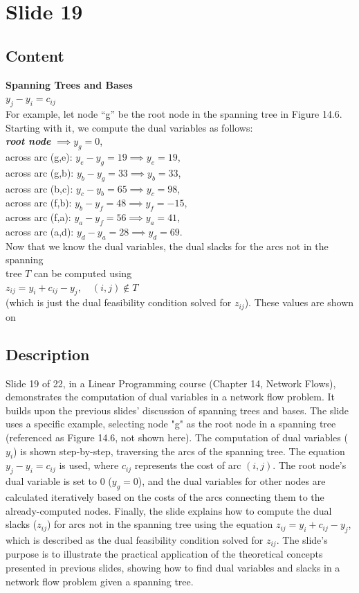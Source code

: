 \documentclass{article}%
\begin{document}
%
\newpage%
\section{Slide 19}%
\label{sec:Slide19}%
\subsection{Content}%

\textbf{Spanning Trees and Bases} \\
$y_j - y_i = c_{ij}$ \\
For example, let node ``g'' be the root node in the spanning tree in Figure 14.6. \\
Starting with it, we compute the dual variables as follows: \\
\textbf{\textit{root node}} $\implies y_g = 0$, \\
across arc (g,e): $y_e - y_g = 19 \implies y_e = 19$, \\
across arc (g,b): $y_b - y_g = 33 \implies y_b = 33$, \\
across arc (b,c): $y_c - y_b = 65 \implies y_c = 98$, \\
across arc (f,b): $y_b - y_f = 48 \implies y_f = -15$, \\
across arc (f,a): $y_a - y_f = 56 \implies y_a = 41$, \\
across arc (a,d): $y_d - y_a = 28 \implies y_d = 69$. \\
Now that we know the dual variables, the dual slacks for the arcs not in the spanning \\
tree $T$ can be computed using \\
$z_{ij} = y_i + c_{ij} - y_j, \quad (i,j) \notin T$ \\
(which is just the dual feasibility condition solved for $z_{ij}$). These values are shown on
%
\subsection{Description}%
Slide 19 of 22, in a Linear Programming course (Chapter 14, Network Flows), demonstrates the computation of dual variables in a network flow problem.  It builds upon the previous slides' discussion of spanning trees and bases. The slide uses a specific example, selecting node "g" as the root node in a spanning tree (referenced as Figure 14.6, not shown here).  The computation of dual variables ($y_i$) is shown step-by-step, traversing the arcs of the spanning tree.  The equation $y_j - y_i = c_{ij}$ is used, where $c_{ij}$ represents the cost of arc $(i,j)$.  The root node's dual variable is set to 0 ($y_g = 0$), and the dual variables for other nodes are calculated iteratively based on the costs of the arcs connecting them to the already-computed nodes.  Finally, the slide explains how to compute the dual slacks ($z_{ij}$) for arcs not in the spanning tree using the equation $z_{ij} = y_i + c_{ij} - y_j$, which is described as the dual feasibility condition solved for $z_{ij}$.  The slide's purpose is to illustrate the practical application of the theoretical concepts presented in previous slides, showing how to find dual variables and slacks in a network flow problem given a spanning tree.%
\end{document}
